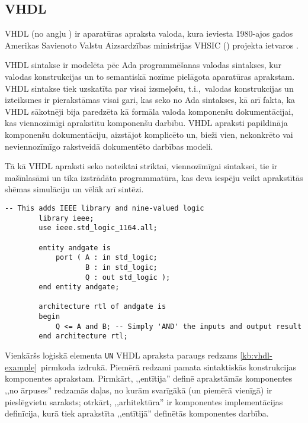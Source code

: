 \subsection{VHDL} \label{sec:vhdl}
	VHDL (no angļu ) ir aparatūras apraksta
	valoda, kura ieviesta 1980-ajos gados Amerikas Savienoto Valstu
	Aizsardzības ministrijas
	VHSIC ()
	projekta ietvaros \cite[141.~lpp.]{VHSIC}\cite[1.~lpp.]{Perry-VHDL}.

	VHDL sintakse ir modelēta pēc Ada programmēšanas valodas sintakses, kur
	valodas konstrukcijas un to semantiskā nozīme pielāgota aparatūras aprakstam.
	VHDL sintakse tiek uzskatīta par visai izsmeļošu, t.i.,~valodas 
	konstrukcijas un izteiksmes ir pierakstāmas visai gari, kas seko no
	Ada sintakses, kā arī fakta, ka VHDL sākotnēji bija paredzēta kā 
	formāla valoda komponenšu dokumentācijai, kas viennozīmīgi aprakstītu
	komponenšu darbību.
	VHDL apraksti papildināja komponenšu dokumentāciju,
	aizstājot komplicēto un, bieži vien,
	nekonkrēto vai neviennozīmīgo rakstveidā dokumentēto darbības modeli.
	
	Tā kā VHDL apraksti seko noteiktai striktai, viennozīmīgai sintaksei,
	tie ir mašīnlasāmi un tika izstrādāta programmatūra, kas deva
	iespēju veikt aprakstītās shēmas simulāciju un vēlāk arī sintēzi.

	\begin{lstlisting}[language={[qucs]VHDL},label=kb:vhdl-example,gobble=4,%
			caption={VHDL apraksts loģiskajam \texttt{UN} elementam.}]
		-- This adds IEEE library and nine-valued logic
		library ieee;
		use ieee.std_logic_1164.all;
		
		entity andgate is
			port ( A : in std_logic;
			       B : in std_logic;
			       Q : out std_logic );
		end entity andgate;
		
		architecture rtl of andgate is
		begin
			Q <= A and B; -- Simply 'AND' the inputs and output result
		end architecture rtl;
	\end{lstlisting}

	Vienkāršs loģiskā elementa \texttt{UN} VHDL apraksta paraugs redzams
	\ref{kb:vhdl-example}~pirmkoda izdrukā. Piemērā redzami pamata sintaktiskās
	konstrukcijas komponentes aprakstam.
	Pirmkārt, ,,entītija'' definē aprakstāmās komponentes ,,no ārpuses''
	redzamās daļas, no kurām svarīgākā (un piemērā vienīgā) ir pieslēgvietu
	saraksts; otrkārt, ,,arhitektūra'' ir komponentes implementācijas definīcija,
	kurā tiek aprakstīta ,,entītijā'' definētās komponentes darbība.

